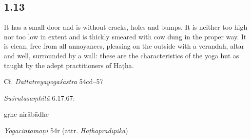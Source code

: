 \begin{ekdosis}
\subsection*{1.13}
\begin{translation}[hp01_013]
It has a small door and is without cracks, holes and bumps. It is neither too high nor too low in extent and is thickly smeared with cow dung in the proper way. It is clean, free from all annoyances, pleasing on the outside with a verandah, altar and well, surrounded by a wall: these are the characteristics of the yoga hut as taught by the adept practitioners of Haṭha.%
\end{translation}

\begin{sources}[hp01_013]
Cf. \emph{Dattātreyayogaśāstra} 54cd–57

\begin{versinnote}
\end{versinnote}

\end{sources}

\begin{testimonia}[hp01_013]
\emph{Suśrutasaṃhitā} 6.17.67:

\begin{versinnote}
gṛhe nirābādhe
\end{versinnote}

\emph{Yogacintāmaṇi} 54r (attr. \emph{Haṭhapradīpikā})


\end{testimonia}
\end{ekdosis}
